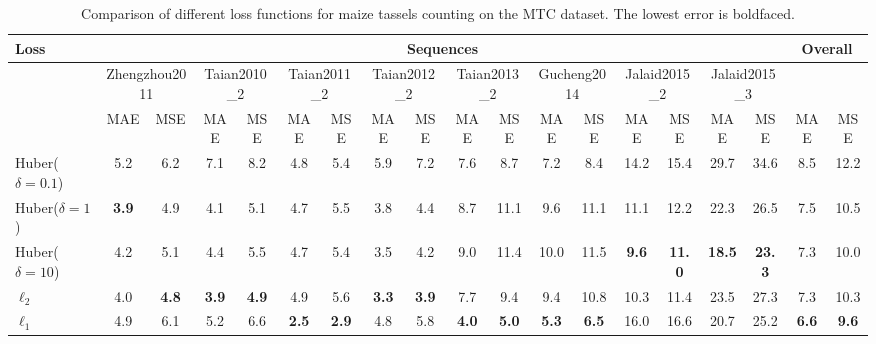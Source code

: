 \documentclass[twocolumn]{bmcart}%
\begin{document}
\begin{table*}[!t] \footnotesize
	\centering
	\caption{Comparison of different loss functions for maize tassels counting on the MTC dataset. The lowest error is boldfaced.}
	\label{tab:loss}
	\renewcommand\arraystretch{1.25}
	\addtolength{\tabcolsep}{-3.5pt}
	\begin{tabular}{l|cc|cc|cc|cc|cc|cc|cc|cc|cc}
		\hline
		Loss                & \multicolumn{16}{c|}{Sequences} & \multicolumn{2}{c}{Overall}\\
		\hline
		& \multicolumn{2}{c|}{\scriptsize Zhengzhou2011}  & \multicolumn{2}{c|}{\scriptsize Taian2010\_2} & \multicolumn{2}{c|}{\scriptsize Taian2011\_2} & \multicolumn{2}{c|}{ \scriptsize Taian2012\_2} & \multicolumn{2}{c|}{\scriptsize Taian2013\_2} & \multicolumn{2}{c|}{\scriptsize Gucheng2014} & \multicolumn{2}{c|}{\scriptsize Jalaid2015\_2} & \multicolumn{2}{c|}{\scriptsize Jalaid2015\_3} & \\
		& MAE  & MSE  & MAE  & MSE  & MAE  & MSE  & MAE  & MSE  & MAE  & MSE  & MAE  & MSE  & MAE  & MSE  & MAE  & MSE  & MAE  & MSE \\
		Huber($\delta=0.1$) & 5.2 & 6.2 & 7.1 & 8.2 & 4.8 & 5.4 & 5.9 & 7.2 & 7.6 & 8.7 & 7.2 & 8.4 & 14.2 & 15.4 & 29.7 & 34.6 & 8.5 & 12.2\\
		Huber($\delta=1$)   & \textbf{3.9} & 4.9 & 4.1 & 5.1 & 4.7 & 5.5 & 3.8 & 4.4 & 8.7 & 11.1 & 9.6 & 11.1 & 11.1 & 12.2 & 22.3 & 26.5 & 7.5 & 10.5\\
		Huber($\delta=10$)  & 4.2 & 5.1 & 4.4 & 5.5 & 4.7 & 5.4 & 3.5 & 4.2 & 9.0 & 11.4 & 10.0 & 11.5 & \textbf{9.6} & \textbf{11.0} & \textbf{18.5} & \textbf{23.3} & 7.3 & 10.0\\
		$\ell_2$  & 4.0 & \textbf{4.8} & \textbf{3.9} & \textbf{4.9} & 4.9 & 5.6 & \textbf{3.3} & \textbf{3.9} & 7.7 & 9.4 & 9.4 & 10.8 & 10.3 & 11.4 & 23.5 & 27.3 & 7.3 & 10.3\\
		$\ell_1$  & 4.9 & 6.1 & 5.2 & 6.6 & \textbf{2.5} & \textbf{2.9} & 4.8 & 5.8 & \textbf{4.0} & \textbf{5.0} & \textbf{5.3} & \textbf{6.5} & 16.0 & 16.6 & 20.7 & 25.2 & \textbf{6.6} & \textbf{9.6}\\
		\hline
	\end{tabular}
\end{table*}
\end{document}

